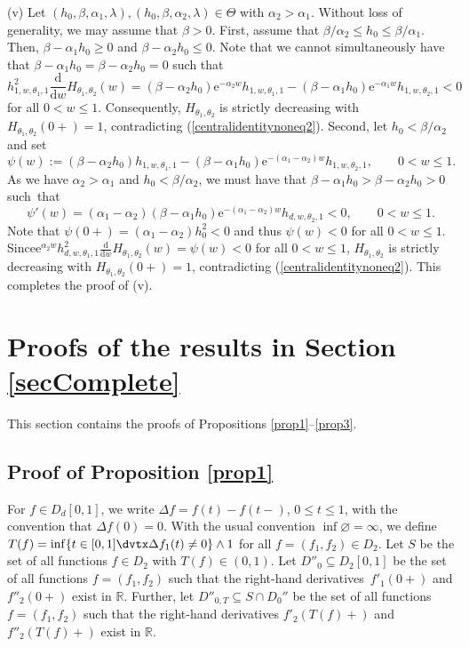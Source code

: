 \documentclass[number,citesort,seceqn,dvips]{arxbj}
\newcommand{\eqref}[1]{(\ref{#1})}
\newcommand{\RR}{\mathbb{R}}
\begin{document}
(v)   Let
$(h_{0},\beta,\alpha_1,\lambda),(h_{0},\beta,\alpha_2,\lambda)\in
\Theta$
with $\alpha_{2}>\alpha_{1}$. Without loss of generality, we may assume
that $\beta > 0$. First, assume that $\beta/\alpha_2\le h_0\le
\beta/\alpha_1$. Then, $\beta-\alpha_1 h_0\ge0$ and $\beta-\alpha_2
h_0\le0$. Note that we cannot simultaneously have that
$\beta - \alpha_1 h_0=\beta - \alpha_2 h_0= 0$ such that
%
\[
h_{1,w,\theta_1,1}^2 \frac{\mathrm{d}}{\mathrm{d}w}H_{\theta_1,\theta_2}(w) =
(\beta - \alpha_2h_0)\mathrm{e}^{-\alpha_2 w}h_{1,w,\theta_1,1}
-(\beta - \alpha_1h_0)\mathrm{e}^{-\alpha_1 w}h_{1,w,\theta_2,1}<0
\]
%
for all $0<w\le1$. Consequently, $H_{\theta_1,\theta_2}$ is strictly
decreasing with $H_{\theta_1,\theta_2}(0+)=1$,
contradicting \eqref{centralidentitynoneq2}. Second, let
$h_0<\beta/\alpha_2$ and set
%
\[
\psi(w):=
(\beta-\alpha_2h_0)h_{1,w,\theta_1,1}
-(\beta-\alpha_1h_0)\mathrm{e}^{-(\alpha_1-\alpha_2) w}h_{1,w,\theta_2,1},\qquad
 0<w\le1 .
\]
%
As we have $\alpha_2>\alpha_1$ and $h_0<\beta/\alpha_2$, we must have
that $\beta - \alpha_1h_0>\beta - \alpha_2h_0>0$ such~that
%
\[
\psi'(w)=(\alpha_1 - \alpha_2)(\beta - \alpha_1h_0)\mathrm{e}^{-(\alpha
_1 - \alpha_2) w}h_{d,w,\theta_2,1}<0,\qquad
 0<w\le1 .
\]
%
Note that $\psi(0+)=(\alpha_1 - \alpha_2)
h_0^2<0$ and thus $\psi(w)<0$ for all $0<w\le1$. Since\break $\mathrm{e}^{\alpha_2w
}h_{d,w,\theta_1,1}^2 \frac{\mathrm{d}}{\mathrm{d}w}H_{\theta_1,\theta_2}(w)=\psi(w)<0$
for all $0 < w \le  1$, $H_{\theta_1,\theta_2}$ is strictly
decreasing with $H_{\theta_1,\theta_2}(0+)=1$,
contradicting \eqref{centralidentitynoneq2}. This completes the proof
of (v).\

\vspace*{-3pt}\section{\texorpdfstring{Proofs of the results in Section \protect\ref{secComplete}}
{Proofs of the results in Section 2.4}}\vspace*{-3pt}\label{SUBSEC4.9}
This section contains the proofs of Propositions \ref{prop1}--\ref{prop3}.
%
\vspace*{-3pt}\subsection{\texorpdfstring{Proof of Proposition \protect\ref{prop1}}
{Proof of Proposition 2.1}}\vspace*{-3pt}\label{proofprop1} For
$f\in D_d[0,1]$, we write $\Delta f=f(t)-f(t-)$,
$0\le t\le1$, with the convention that $\Delta f(0)=0$. With the usual
convention $\inf\varnothing=\infty$, we define
$T(f)=\inf\{t\in[0,1]\dvtx\Delta f_1(t)\neq0\}\wedge1$ for all
$f=(f_1,f_2)\in D_2$. Let $S$ be the set of all functions $f\in D_2$
with $T(f)\in(0,1)$. Let $D''_{0}\subseteq D_2[0,1]$ be the set of all
functions $f=(f_1,f_2)$ such that the right-hand derivatives~$f'_1(0+)$
and $f''_2(0+)$ exist in $\RR$. Further, let $D''_{0,T}\subseteq S\cap
D_0''$ be the set of all functions $f=(f_1,f_2)$ such that the
right-hand derivatives $f'_2(T(f)+)$ and $f''_2(T(f)+)$ exist in $\RR$.
\end{document}
